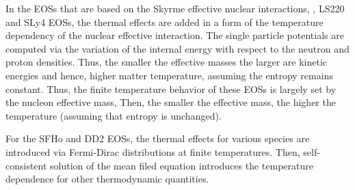 In the \acp{EOS} that are based on the Skyrme effective nuclear interactions, \eg, LS220 and SLy4 \acp{EOS}, 
the thermal effects are added 
in a form of the temperature dependency of the nuclear effective interaction. %
%
The single particle potentials are computed via the variation of the internal energy with respect to the 
neutron and proton densities. Thus, the smaller the effective masses the larger are kinetic energies and hence, 
higher matter temperature, assuming the entropy remains constant.
%
Thus, the finite temperature behavior of these \acp{EOS} is largely set by the nucleon effective mass,
Then, the smaller the effective mass, the higher the temperature (assuming that entropy is unchanged).

%
For the SFHo and DD2 \acp{EOS}, 
the thermal effects for various species are introduced via Fermi-Dirac distributions at finite temperatures.
Then, self-consistent solution of the mean filed equation introduces the temperature dependence for other 
thermodynamic quantities.%

